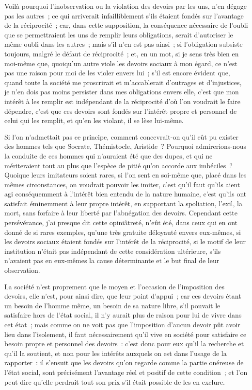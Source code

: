 \documentclass[french,twoside]{book} %
\begin{document}
Voilà pourquoi l’inobservation ou la violation des devoirs par les uns, n’en dégage pas les autres ; ce qui arriverait infailliblement s’ils étaient fondés sur l’avantage de la réciprocité ; car, dans cette supposition, la conséquence nécessaire de l’oubli que se permettraient les uns de remplir leurs obligations, serait d’autoriser le même oubli dans les autres ; mais s’il n’en est pas ainsi ; si l’obligation subsiste toujours, malgré le défaut de réciprocité ; et, en un mot, si je sens très bien en moi-même que, quoiqu’un autre viole les devoirs sociaux à mon égard, ce n’est pas une raison pour moi de les violer envers lui ; s’il est encore évident que, quand toute la société me proscrirait et m’accablerait d’outrages et d’injustices, je n’en dois pas moins persister dans mes obligations envers elle, c’est que mon intérêt à les remplir est indépendant de la réciprocité d’où l’on voudrait le faire dépendre, c’est que ces devoirs sont fondés sur l’intérêt propre et personnel de celui qui les remplit, et qu’en les violant, il se lèse lui-même.\par
Si l’on n’admettait pas ce principe, comment concevrait-on qu’il eût pu exister des hommes tels que Socrate, Thémistocle, Aristide ? Pourquoi admirerions-nous la conduite de ces hommes qui n’auraient été que des dupes, et qui ne mériteraient tout au plus que l’espèce de pitié qu’on accorde aux imbéciles ? Quoique leurs imitateurs soient rares, si l’on sent en soi-même que, placé dans les mêmes circonstances, on voudrait pouvoir les imiter, c’est qu’il faut qu’ils aient agi conséquemment à l’intérêt bien entendu de la nature humaine, c’est qu’ils ont satisfait éminemment à leur propre intérêt, en supportant la spoliation, l’exil, la mort, sans forfaire à leur liberté par l’abnégation des devoirs. Cependant cette persévérance, j’ai presque dit cette opiniâtreté, n’eût été, dans ceux qui en ont donné de si rares exemples, qu’une très gratuite déloyauté envers eux-mêmes, si les devoirs sociaux étaient fondés sur l’intérêt de la réciprocité, si le motif de leur institution n’était pas indépendant de cette considération ultérieure, s’ils n’avaient pas en eux-mêmes la cause déterminante et le but final de leur observation.\par
La société n’est proprement que le moyen et l’occasion de l’imposition des devoirs, elle n’est, pour ainsi dire, que leur point d’appui ; car ces devoirs étant un besoin de l’homme même, un besoin de sa nature libre, s’il pouvait le satisfaire hors de l’état social, il n’y aurait plus de raison pour lui de vivre dans cet état ; mais comme on ne voit pas que l’imposition d’aucun devoir pût avoir lieu dans l’isolement, il faut nécessairement qu’il vive en société pour satisfaire ce besoin propre et personnel des devoirs : c’est donc pour eux qu’il la recherche et qu’il la soutient, et non pour les intérêts auxquels on est dans l’usage de la rapporter : il s’ensuit que les devoirs qu’on regarde comme la partie onéreuse de l’état social, sont précisément l’avantage réel et positif de cette condition ; et l’on peut dire qu’elle perdrait tout son prix s’il était possible de les en exclure.\par
\end{document}
